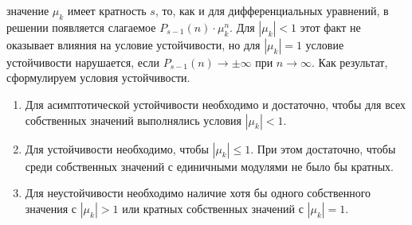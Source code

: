 значение $\mu_k$ имеет кратность $s$, то, как и для дифференциальных уравнений, в решении появляется
слагаемое $\displaystyle P_{s-1}(n)\cdot \mu_k^n$. Для $|\mu_k| < 1$ этот факт не оказывает влияния
на условие устойчивости, но для $|\mu_k| = 1$ условие устойчивости нарушается, если $\displaystyle P_{s-1}(n) \rightarrow \pm \infty \text{ при } n \rightarrow \infty$.
Как результат, сформулируем условия устойчивости.
\begin{enumerate}
    \item Для асимптотической устойчивости необходимо и достаточно, чтобы для всех собственных
    значений выполнялись условия $\displaystyle |\mu_k| < 1$.
    \item Для устойчивости необходимо, чтобы $\displaystyle |\mu_k| \leq 1$. При этом достаточно, чтобы
    среди собственных значений с единичными модулями не было бы кратных.
    \item Для неустойчивости необходимо наличие хотя бы одного собственного значения с $\displaystyle |\mu_k| > 1$
    или кратных собственных значений с $\displaystyle |\mu_k| = 1$.
\end{enumerate}
